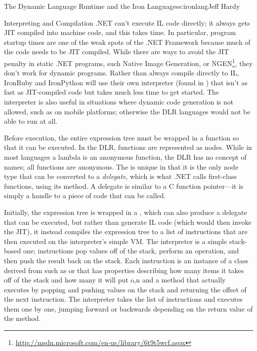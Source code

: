 \begin{aosachapter}{The Dynamic Language Runtime and the Iron Languages}{s:ironlang}{Jeff Hardy}
\begin{aosasect1}{Interpreting and Compilation}
.NET can't execute IL code directly; it always gets JIT compiled into
machine code, and this takes time. In particular, program startup
times are one of the weak spots of the .NET Framework because much of
the code needs to be JIT compiled. While there are ways to avoid the
JIT penalty in static .NET programs, such Native Image Generation, or
NGEN\footnote{\url{http://msdn.microsoft.com/en-us/library/6t9t5wcf.aspx}},
they don't work for dynamic programs. Rather than always compile
directly to IL, IronRuby and IronPython will use their own interpreter
(found in ) that isn't as fast
as JIT-compiled code but takes much less time to get started. The
interpreter is also useful in situations where dynamic code generation
is not allowed, such as on mobile platforms; otherwise the DLR
languages would not be able to run at all.

Before execution, the entire expression tree must be wrapped in a
function so that it can be executed. In the DLR, functions are
represented as  nodes. While in most languages
a lambda is an anonymous function, the DLR has no concept of names;
all functions are anonymous. The  is unique in
that it is the only node type that can be converted to a
\emph{delegate}, which is what .NET calls first-class functions, using
its  method. A delegate is similar to a C function
pointer---it is simply a handle to a piece of code that can be called.

Initially, the expression tree is wrapped in a
, which can also produce a delegate that
can be executed, but rather than generate IL code (which would then
invoke the JIT), it instead compiles the expression tree to a list of
instructions that are then executed on the interpreter's simple
VM. The interpreter is a simple stack-based one; instructions pop
values off of the stack, perform an operation, and then push the
result back on the stack. Each instruction is an instance of a class
derived from  such
as  or  that has
properties describing how many items it takes off of the stack and how
many it will put o,n and a  method that actually executes
by popping and pushing values on the stack and returning the offset of
the next instruction. The interpreter takes the list of instructions
and executes them one by one, jumping forward or backwards depending
on the return value of the  method.


\end{aosasect1}
\end{aosachapter}
